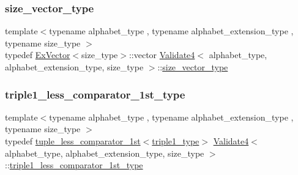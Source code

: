 \mbox{\label{class_validate4_a46ea31a0a4b23f583806792160421d15}} 
\subsubsection{\texorpdfstring{size\+\_\+vector\+\_\+type}{size\_vector\_type}}
{\footnotesize\ttfamily template$<$typename alphabet\+\_\+type , typename alphabet\+\_\+extension\+\_\+type , typename size\+\_\+type $>$ \\
typedef \hyperlink{struct_ex_vector}{Ex\+Vector}$<$size\+\_\+type$>$\+::vector \hyperlink{class_validate4}{Validate4}$<$ alphabet\+\_\+type, alphabet\+\_\+extension\+\_\+type, size\+\_\+type $>$\+::\hyperlink{class_validate4_a46ea31a0a4b23f583806792160421d15}{size\+\_\+vector\+\_\+type}\hspace{0.3cm}{\ttfamily [private]}}

\mbox{\label{class_validate4_af07a5152d547f7fba2f93b78660b88ab}} 
\subsubsection{\texorpdfstring{triple1\+\_\+less\+\_\+comparator\+\_\+1st\+\_\+type}{triple1\_less\_comparator\_1st\_type}}
{\footnotesize\ttfamily template$<$typename alphabet\+\_\+type , typename alphabet\+\_\+extension\+\_\+type , typename size\+\_\+type $>$ \\
typedef \hyperlink{structtuple__less__comparator__1st}{tuple\+\_\+less\+\_\+comparator\+\_\+1st}$<$\hyperlink{class_validate4_a8dd208bf04e6c5285cdacb9ac9532a67}{triple1\+\_\+type}$>$ \hyperlink{class_validate4}{Validate4}$<$ alphabet\+\_\+type, alphabet\+\_\+extension\+\_\+type, size\+\_\+type $>$\+::\hyperlink{class_validate4_af07a5152d547f7fba2f93b78660b88ab}{triple1\+\_\+less\+\_\+comparator\+\_\+1st\+\_\+type}\hspace{0.3cm}{\ttfamily [private]}}

\mbox{\label{class_validate4_aa4a137d0ed68e95db5ebbe57544d80ed}} 

